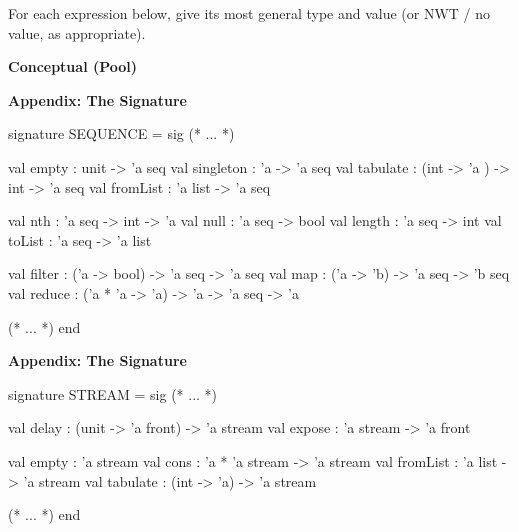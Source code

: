 \documentclass[addpoints,12pt]{exam}
\begin{document}
\begin{questions}
For each expression below, give its most general type and value (or NWT / no
value, as appropriate).

\begin{parts}

\end{parts}

\newpage
{}
\textbf{Conceptual (Pool)}

\begin{parts}

\end{parts}

\newpage

\textbf{Appendix: The  Signature}

\begin{codeblock}
  signature SEQUENCE =
    sig
      (* ... *)

      val empty : unit -> 'a seq
      val singleton : 'a -> 'a seq
      val tabulate : (int -> 'a ) -> int -> 'a seq
      val fromList : 'a list -> 'a seq

      val nth : 'a seq -> int -> 'a
      val null : 'a seq -> bool
      val length : 'a seq -> int
      val toList : 'a seq -> 'a list

      val filter : ('a -> bool) -> 'a seq -> 'a seq
      val map : ('a -> 'b) -> 'a seq -> 'b seq
      val reduce : ('a * 'a -> 'a) -> 'a -> 'a seq -> 'a

      (* ... *)
    end
\end{codeblock}

\vspace{20pt}

\textbf{Appendix: The  Signature}

\begin{codeblock}
signature STREAM =
  sig
    (* ... *)

    val delay : (unit -> 'a front) -> 'a stream
    val expose : 'a stream -> 'a front

    val empty : 'a stream
    val cons : 'a * 'a stream -> 'a stream
    val fromList : 'a list -> 'a stream
    val tabulate : (int -> 'a) -> 'a stream

    (* ... *)
  end
\end{codeblock}




\end{questions}
\end{document}

